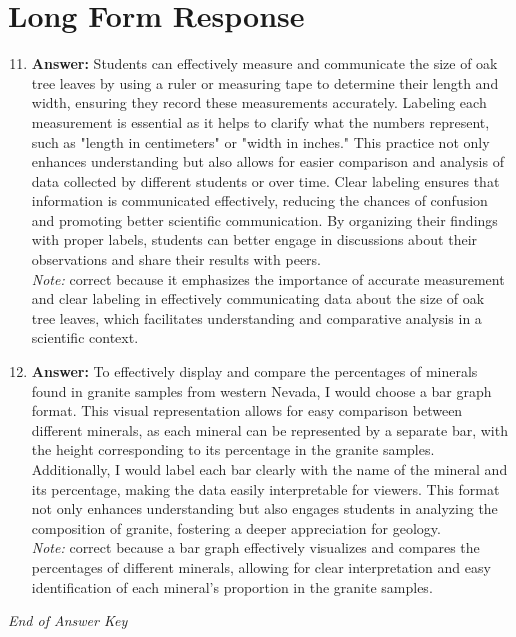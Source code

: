 \documentclass[12pt]{article}
\begin{document}
\section*{Long Form Response}
\begin{enumerate}[label=\arabic*.]
\setcounter{enumi}{10}
\item \textbf{Answer:} Students can effectively measure and communicate the size of oak tree leaves by using a ruler or measuring tape to determine their length and width, ensuring they record these measurements accurately. Labeling each measurement is essential as it helps to clarify what the numbers represent, such as "length in centimeters" or "width in inches." This practice not only enhances understanding but also allows for easier comparison and analysis of data collected by different students or over time. Clear labeling ensures that information is communicated effectively, reducing the chances of confusion and promoting better scientific communication. By organizing their findings with proper labels, students can better engage in discussions about their observations and share their results with peers.
\\ \textit{Note:} correct because it emphasizes the importance of accurate measurement and clear labeling in effectively communicating data about the size of oak tree leaves, which facilitates understanding and comparative analysis in a scientific context.
\item \textbf{Answer:} To effectively display and compare the percentages of minerals found in granite samples from western Nevada, I would choose a bar graph format. This visual representation allows for easy comparison between different minerals, as each mineral can be represented by a separate bar, with the height corresponding to its percentage in the granite samples. Additionally, I would label each bar clearly with the name of the mineral and its percentage, making the data easily interpretable for viewers. This format not only enhances understanding but also engages students in analyzing the composition of granite, fostering a deeper appreciation for geology.
\\ \textit{Note:} correct because a bar graph effectively visualizes and compares the percentages of different minerals, allowing for clear interpretation and easy identification of each mineral's proportion in the granite samples.
\end{enumerate}

\vfill
\noindent\textit{End of Answer Key}
\end{document}

